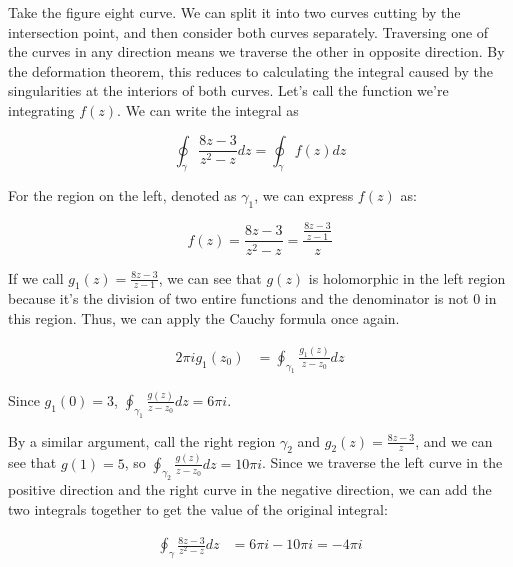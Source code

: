 Take the figure eight curve. We can split it into two curves cutting by the
intersection point, and then consider both curves separately. Traversing one of
the curves in any direction means we traverse the other in opposite direction.
By the deformation theorem, this reduces to calculating the integral caused by
the singularities at the interiors of both curves. Let's call the function
we're integrating $f(z)$. We can write the integral as

\[ \oint_\gamma \frac{{8z - 3}}{{z^2 - z}}  dz = \oint_\gamma f(z) dz\]

For the region on the left, denoted as $\gamma_1$, we can express $f(z)$ as:

\[ f(z) = \frac{{8z - 3}}{{z^2 - z}} = \frac{\frac{8z - 3}{z-1}}{{z}}\]

If we call $g_1(z) = \frac{8z - 3}{z-1}$, we can see that $g(z)$ is holomorphic
in the left region because it's the division of two entire functions and the
denominator is not 0 in this region. Thus, we can apply the Cauchy formula once
again.

\begin{align*}
    2\pi ig_1(z_0) & = \oint_{\gamma_1}\frac{g_1(z)}{z-z_0}dz
\end{align*}

Since $g_1(0) = 3$, $\oint_{\gamma_1}\frac{g(z)}{z-z_0}dz = 6\pi i$.

By a similar argument, call the right region $\gamma_2$ and $g_2(z) = \frac{8z
        - 3}{z}$, and we can see that $g(1) = 5$, so
$\oint_{\gamma_2}\frac{g(z)}{z-z_0}dz = 10\pi i$. Since we traverse the left
curve in the positive direction and the right curve in the negative direction,
we can add the two integrals together to get the value of the original
integral:

\begin{align*}
    \oint_\gamma \frac{{8z - 3}}{{z^2 - z}}  dz & = 6\pi i - 10\pi i = -4\pi i
\end{align*}